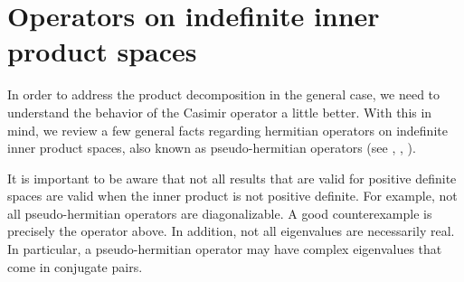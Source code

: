 \documentclass[a4paper,dvips,12pt]{article}
\begin{document}
    \section{Operators on indefinite inner product spaces}

    In order to address the product decomposition in the general case,
    we need to understand the behavior of the Casimir operator \coordHE{}
    a little better.  With this in mind,
    we review a few
    general facts regarding hermitian operators on indefinite inner
    product spaces, also known as pseudo-hermitian operators (see \cite{BOGNAR},
    \cite{MALCEV}, \cite{JACOBZYK}).

    It is important to be aware that not all results
    that are valid for positive definite spaces are valid when the
    inner product is not positive definite.  For example, not all
    pseudo-hermitian operators are diagonalizable.  A good
    counterexample is precisely the operator \coordHE{} above.
    In addition, not all eigenvalues are necessarily real.  In
    particular, a pseudo-hermitian operator may have complex
    eigenvalues that come in conjugate pairs.
\end{document}
